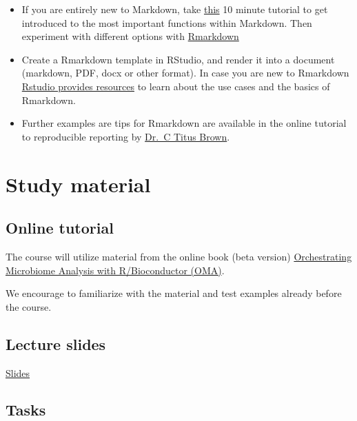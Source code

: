 \documentclass[
  oneside]{book}
\begin{document}
\begin{itemize}
\item
  If you are entirely new to Markdown, take
  \href{https://www.markdowntutorial.com/}{this} 10 minute tutorial to get
  introduced to the most important functions within Markdown. Then
  experiment with different options with
  \href{https://www.rstudio.com/wp-content/uploads/2015/02/rmarkdown-cheatsheet.pdf}{Rmarkdown}
\item
  Create a Rmarkdown template in RStudio, and render it into a
  document (markdown, PDF, docx or other format). In case you are new
  to Rmarkdown \href{https://rmarkdown.rstudio.com/lesson-1.html}{Rstudio provides
  resources} to learn
  about the use cases and the basics of Rmarkdown.
\item
  Further examples are tips for Rmarkdown are available in the
  online tutorial to reproducible reporting by \href{https://rpubs.com/marschmi/RMarkdown}{Dr.~C Titus
  Brown}.
\end{itemize}

\hypertarget{material}{%
\chapter{Study material}\label{material}}

\hypertarget{online-tutorial}{%
\section{Online tutorial}\label{online-tutorial}}

The course will utilize material from the online book (beta version)
\href{https://microbiome.github.io/OMA/}{Orchestrating Microbiome Analysis with R/Bioconductor (OMA)}.

We encourage to familiarize with the material and test examples
already before the course.

\hypertarget{lecture-slides}{%
\section{Lecture slides}\label{lecture-slides}}

\href{https://github.com/microbiome/course_2022_oulu/tree/main/slides}{Slides}

\hypertarget{tasks}{%
\section{Tasks}\label{tasks}}
\end{document}
